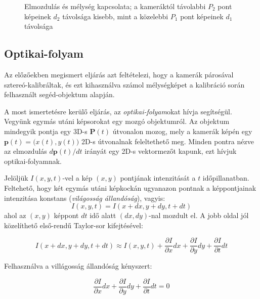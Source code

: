 \begin{figure}[tbh]
  \caption{Elmozdulás és mélység kapcsolata; a kameráktól távolabbi $P_2$ pont képeinek $d_2$ távolsága kisebb, mint a közelebbi $P_1$ pont képeinek $d_1$ távolsága \label{fig:depth-showcase}}
\end{figure}

\subsection{Optikai-folyam}

Az előzőekben megismert eljárás azt feltételezi, hogy a kamerák párosával sztereó-kalibráltak, és ezt kihasználva számol mélységképet a kalibráció során felhasznált segéd-objektum alapján.

A most ismertetésre kerülő eljárás, az \textit{optikai-folyam}okat \cite{optic-flow} hívja segítségül. Vegyünk egymás utáni képsorokat egy mozgó objektumról. Az objektum mindegyik pontja egy 3D-s $\mathbf{P}(t)$ útvonalon mozog, mely a kamerák képén egy $\mathbf{p}(t) = \big(x(t), y(t)\big)$ 2D-s útvonalnak feleltethető meg. Minden pontra nézve az elmozdulás $d\mathbf{p}(t) / dt$ irányát egy 2D-s vektormezőt kapunk, ezt hívjuk optikai-folyamnak.

Jelöljük $I(x, y, t)$-vel a kép $(x, y)$ pontjának intenzitását a $t$ időpillanatban. Feltehető, hogy két egymás utáni képkockán ugyanazon pontnak a képpontjainak intenzitása konstans (\textit{világosság állandóság}), vagyis:
\[I(x, y, t) = I(x+dx, y+dy, t+dt)\]
ahol az $(x,y)$ képpont $dt$ idő alatt $(dx,dy)$-nal mozdult el. A jobb oldal jól közelíthető első-rendű Taylor-sor kifejtésével:

\[I(x+dx, y+dy, t+dt) \approx I(x, y, t) + \frac{\partial I}{\partial x} dx + \frac{\partial I}{\partial y} dy + \frac{\partial I}{\partial t} dt\]

Felhasználva a villágosság állandóság kényszert:

\[\frac{\partial I}{\partial x} dx + \frac{\partial I}{\partial y} dy + \frac{\partial I}{\partial t} dt = 0\]

